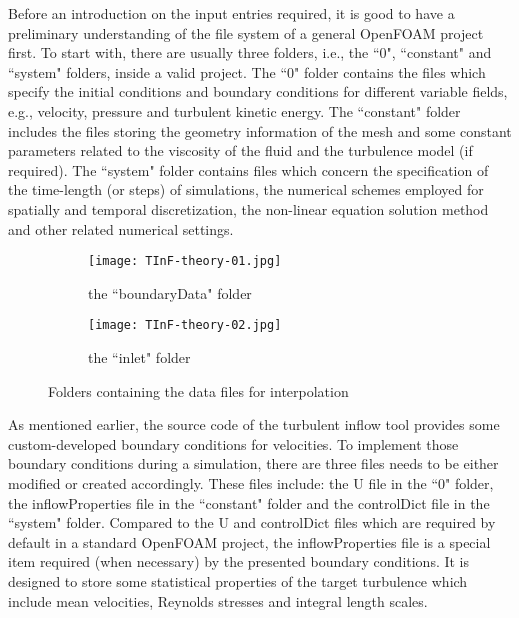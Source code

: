 Before an introduction on the input entries required, it is good to have a preliminary understanding of the file system of a general OpenFOAM project first. To start with, there are usually three folders, i.e., the \textcolor{mauve}{``0"}, \textcolor{mauve}{``constant"} and \textcolor{mauve}{``system"} folders, inside a valid project. The \textcolor{mauve}{``0"} folder contains the files which specify the initial conditions and boundary conditions for different variable fields, e.g., velocity, pressure and turbulent kinetic energy. The \textcolor{mauve}{``constant"} folder includes the files storing the geometry information of the mesh and some constant parameters related to the viscosity of the fluid and the turbulence model (if required). The \textcolor{mauve}{``system"} folder contains files which concern the specification of the time-length (or steps) of simulations, the numerical schemes employed for spatially and temporal discretization, the non-linear equation solution method and other related numerical settings.

\begin{figure}[H]
\centering
    \begin{subfigure}[b]{\linewidth}
        \texttt{[image: TInF-theory-01.jpg]}
        \caption{the \textcolor{mauve}{``boundaryData"} folder}
     \end{subfigure}
    \begin{subfigure}[b]{\linewidth}
        \texttt{[image: TInF-theory-02.jpg]}
        \caption{the \textcolor{mauve}{``inlet"} folder}
    \end{subfigure}
      \caption{Folders containing the data files for interpolation} \label{folder}
\end{figure}

As mentioned earlier, the source code of the turbulent inflow tool provides some custom-developed boundary conditions for velocities. To implement those boundary conditions during a simulation, there are three files needs to be either modified or created accordingly. These files include: the \textcolor{mauve}{U} file in the \textcolor{mauve}{``0"} folder, the \textcolor{mauve}{inflowProperties} file in the \textcolor{mauve}{``constant"} folder and the \textcolor{mauve}{controlDict} file in the \textcolor{mauve}{``system"} folder. Compared to the \textcolor{mauve}{U} and \textcolor{mauve}{controlDict} files which are required by default in a standard OpenFOAM project, the \textcolor{mauve}{inflowProperties} file is a special item required (when necessary) by the presented boundary conditions. It is designed to store some statistical properties of the target turbulence which include mean velocities, Reynolds stresses and integral length scales.


